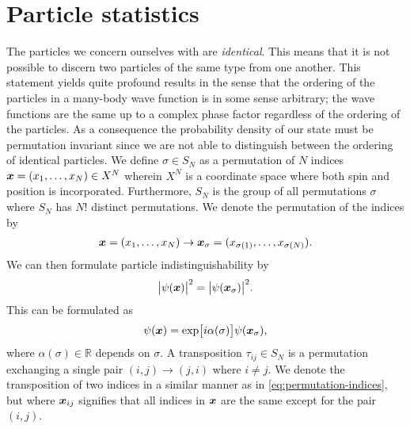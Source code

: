     \section{Particle statistics}
        \label{sec:particle-statistics}
        The particles we concern ourselves with are \emph{identical}.
        This means that it is not possible to discern two particles of the
        same type from one another.
        This statement yields quite profound results in the sense that the
        ordering of the particles in a many-body wave function is in some sense
        arbitrary; the wave functions are the same up to a complex phase factor
        regardless of the ordering of the particles.
        As a consequence the probability density of our state must be
        permutation invariant since we are not able to distinguish between the
        ordering of identical particles.
        We define $\sigma \in S_{N}$ as a permutation of $N$ indices $\boldsymbol{x}
        = (x_1, \dots, x_N) \in X^{N}$ wherein $X^N$ is a coordinate space where
        both spin and position is incorporated.
        Furthermore, $S_{N}$ is the group of all permutations $\sigma$ where
        $S_{N}$ has $N!$ distinct permutations.
        We denote the permutation of the indices by
        \begin{align}
            \boldsymbol{x} = (x_1, \dots, x_N)
            \to \boldsymbol{x}_{\sigma} = (x_{\sigma(1)}, \dots, x_{\sigma(N)}).
            \label{eq:permutation-indices}
        \end{align}
        We can then formulate particle indistinguishability by
        \cite{leinaas1977, kvaal2017notes}
        \begin{align}
            \abs{
                \psi(\boldsymbol{x})
            }^2
            = \abs{
                \psi(\boldsymbol{x}_{\sigma})
            }^2.
            \label{eq:particle-indistinguishability}
        \end{align}
        This can be formulated as \cite{kvaal2017notes}
        \begin{align}
            \psi(\boldsymbol{x}) = \exp[i\alpha(\sigma)] \psi(\boldsymbol{x}_{\sigma}),
        \end{align}
        where $\alpha(\sigma) \in \mathbb{R}$ depends on $\sigma$.
        A transposition $\tau_{ij} \in S_{N}$ is a permutation exchanging a
        single pair $(i, j) \to (j, i)$ where $i \neq j$.
        We denote the transposition of two indices in a similar manner as in
        \autoref{eq:permutation-indices}, but where $\boldsymbol{x}_{ij}$ signifies that
        all indices in $\boldsymbol{x}$ are the same except for the pair $(i, j)$.
